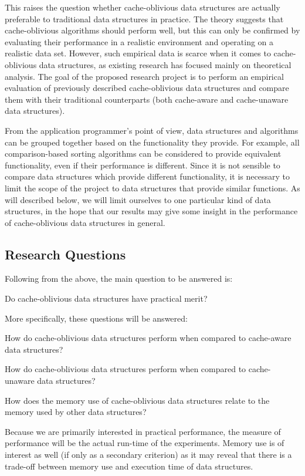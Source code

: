 \documentclass{acm_proc_article-sp}
\begin{document}
This raises the question whether cache-oblivious data structures are actually preferable to traditional data structures in practice. The theory suggests that cache-oblivious algorithms should perform well, but this can only be confirmed by evaluating their performance in a realistic environment and operating on a realistic data set. However, such empirical data is scarce when it comes to cache-oblivious data structures, as existing research has focused mainly on theoretical analysis. The goal of the proposed research project is to perform an empirical evaluation of previously described cache-oblivious data structures and compare them with their traditional counterparts (both cache-aware and cache-unaware data structures).

From the application programmer's point of view, data structures and algorithms can be grouped together based on the functionality they provide. For example, all comparison-based sorting algorithms can be considered to provide equivalent functionality, even if their performance is different. Since it is not sensible to compare data structures which provide different functionality, it is necessary to limit the scope of the project to data structures that provide similar functions. As will described below, we will limit ourselves to one particular kind of data structures, in the hope that our results may give some insight in the performance of cache-oblivious data structures in general.

\subsection{Research Questions}
Following from the above, the main question to be answered is:
\begin{list}{}{}
\item Do cache-oblivious data structures have practical merit?
\end{list}

More specifically, these questions will be answered:
\begin{list}{.}{}
\item How do cache-oblivious data structures perform when compared to cache-aware data structures?
\item How do cache-oblivious data structures perform when compared to cache-unaware data structures?
\item How does the memory use of cache-oblivious data structures relate to the memory used by other data structures?
\end{list}
Because we are primarily interested in practical performance, the measure of performance will be the actual run-time of the experiments. Memory use is of interest as well (if only as a secondary criterion) as it may reveal that there is a trade-off between memory use and execution time of data structures.
\end{document}
